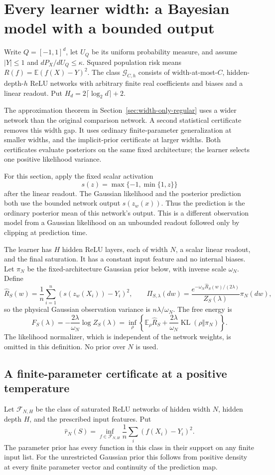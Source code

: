 \section{Every learner width: a Bayesian model with a bounded output}
\label{sec:all-width-saturation}
Write $Q=[-1,1]^d$, let $U_Q$ be its uniform probability measure, and assume $|Y|\le1$ and $dP_X/dU_Q\le\kappa$. Squared population risk means $R(f)=\mathbb E(f(X)-Y)^2$. The class $\mathcal G_{C,h}$ consists of width-at-most-$C$, hidden-depth-$h$ ReLU networks with arbitrary finite real coefficients and biases and a linear readout. Put $H_d=2\lceil\log_2 d\rceil+2$.

The approximation theorem in Section~\ref{sec:width-only-regular} uses a wider network than the original comparison network. A second statistical certificate removes this width gap. It uses ordinary finite-parameter generalization at smaller widths, and the implicit-prior certificate at larger widths. Both certificates evaluate posteriors on the same fixed architecture; the learner selects one positive likelihood variance.

For this section, apply the fixed scalar activation
\[
 s(z)=\max\{-1,\min\{1,z\}\}
\]
after the linear readout. The Gaussian likelihood and the posterior prediction both use the bounded network output $s(z_w(x))$. Thus the prediction is the ordinary posterior mean of this network's output. This is a different observation model from a Gaussian likelihood on an unbounded readout followed only by clipping at prediction time.

The learner has $H$ hidden ReLU layers, each of width $N$, a scalar linear readout, and the final saturation. It has a constant input feature and no internal biases. Let $\pi_N$ be the fixed-architecture Gaussian prior below, with inverse scale $\omega_N$. Define
\[
 \widehat R_S(w)=\frac1n\sum_{i=1}^n(s(z_w(X_i))-Y_i)^2,
 \qquad
 \Pi_{S,\lambda}(dw)=
 \frac{e^{-\omega_N\widehat R_S(w)/(2\lambda)}}{Z_S(\lambda)}\pi_N(dw),
\]
so the physical Gaussian observation variance is $n\lambda/\omega_N$. The free energy is
\[
 F_S(\lambda)=-\frac{2\lambda}{\omega_N}\log Z_S(\lambda)
 =\inf_{\rho}\left\{\mathbb E_\rho\widehat R_S+
                   \frac{2\lambda}{\omega_N}\operatorname{KL}(\rho\Vert\pi_N)\right\}.
\]
The likelihood normalizer, which is independent of the network weights, is omitted in this definition. No prior over $N$ is used.

\subsection{A finite-parameter certificate at a positive temperature}
Let $\mathcal F_{N,H}$ be the class of saturated ReLU networks of hidden width $N$, hidden depth $H$, and the prescribed input features. Put
\[
 \widehat r_N(S)=\inf_{f\in\mathcal F_{N,H}}\frac1n\sum_i(f(X_i)-Y_i)^2.
\]
The parameter prior has every function in this class in their support on any finite input list. For the unrestricted Gaussian prior this follows from positive density at every finite parameter vector and continuity of the prediction map.

